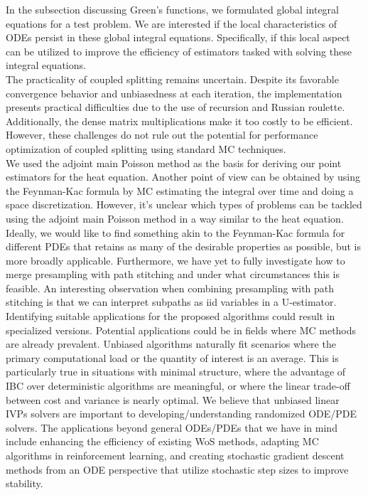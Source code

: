 \documentclass[a4paper,12pt]{article}
\begin{document}
In the subsection discussing Green's functions, we formulated global integral equations for a test problem. We are interested if the local characteristics of ODEs persist in these global integral equations. Specifically, if this local aspect can be utilized to improve the efficiency of estimators tasked with solving these integral equations. \\

The practicality of coupled splitting remains uncertain. Despite its favorable convergence behavior and unbiasedness at each iteration, the implementation presents practical difficulties due to the use of recursion and Russian roulette. Additionally, the dense matrix multiplications make it too costly to be efficient. However, these challenges do not rule out the potential for performance optimization of coupled splitting using standard MC techniques. \\

We used the adjoint main Poisson method as the basis for deriving our point estimators for the heat equation. Another point of view can be obtained by using the Feynman-Kac formula by MC estimating the integral over time and doing a space discretization. However, it's unclear which types of problems can be tackled using the adjoint main Poisson method in a way similar to the heat equation. Ideally, we would like to find something akin to the Feynman-Kac formula for different PDEs that retains as many of the desirable properties as possible, but is more broadly applicable. Furthermore, we have yet to fully investigate how to merge presampling with path stitching and under what circumstances this is feasible. An interesting observation when combining presampling with path stitching is that we can interpret subpaths as iid variables in a U-estimator. \\

Identifying suitable applications for the proposed algorithms could result in specialized versions. Potential applications could be in fields where MC methods are already prevalent. Unbiased algorithms naturally fit scenarios where the primary computational load or the quantity of interest is an average. This is particularly true in situations with minimal structure, where the advantage of IBC over deterministic algorithms are meaningful, or where the linear trade-off between cost and variance is nearly optimal. We believe that unbiased linear IVPs solvers are important to developing/understanding randomized ODE/PDE solvers. The applications beyond general ODEs/PDEs that we have in mind include enhancing the efficiency of existing WoS methods, adapting MC algorithms in reinforcement learning, and creating stochastic gradient descent methods from an ODE perspective that utilize stochastic step sizes to improve stability. \\
\end{document}
